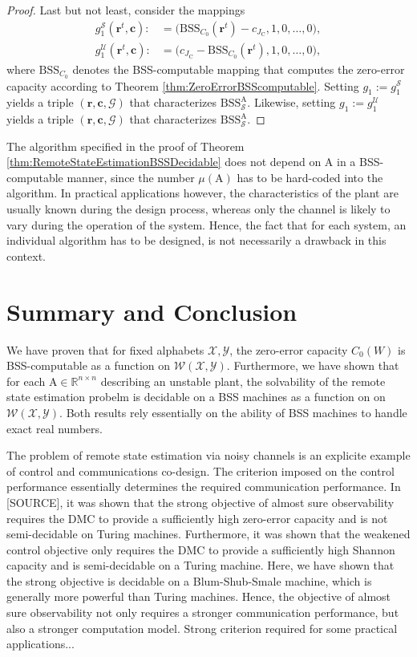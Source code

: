 \documentclass[conference]{IEEEtran}
\def\X{{\mathcal X}}
\def\Y{{\mathcal Y}}
\def\G{{\mathcal G}}
\def\W{{\mathcal W}}
\def\S{{\mathcal S}}
\def\U{{\mathcal U}}
\def\RR{{\mathbb R}}
\def\mA{\bm{\mathrm{A}}}
\newcommand{\BSS}{\mathrm{BSS}}
\newcommand{\sdummy}{{\color{red}[SOURCE]}}
\begin{document}
\begin{proof}
					Last but not least, consider the mappings
					\begin{align*}	g_1^\S(\bm{r}^t,\bm{c}) :&= \big(\BSS_{C_0}(\bm{r}^t) - c_{J_\mathrm{C}}, 1, 0, \ldots, 0\big), \\
									g_1^\U(\bm{r}^t,\bm{c}) :&= \big(c_{J_\mathrm{C}} - \BSS_{C_0}(\bm{r}^t), 1, 0, \ldots, 0\big), 
					\end{align*}
					where \(\BSS_{C_0}\) denotes the BSS-computable mapping that computes the zero-error capacity according to Theorem \ref{thm:ZeroErrorBSScomputable}. 
					Setting \(g_1 := g_1^\S\) yields a triple \((\bm{r}, \bm{c}, \G)\)
					that characterizes \(\BSS_{\S}^{\mA}\). Likewise, setting \(g_1 := g_1^\U\) yields a triple \((\bm{r}, \bm{c}, \G)\)
					that characterizes \(\BSS_{\S}^{\mA}\).
	\end{proof}
	
	The algorithm specified in the proof of Theorem \ref{thm:RemoteStateEstimationBSSDecidable} does not depend on \(\mA\) in a BSS-computable manner,
	since the number \(\mu(\mA)\) has to be hard-coded into the algorithm. In practical applications however, the characteristics of the plant
	are usually known during the design process, whereas only the channel is likely to vary during the operation
	of the system. Hence, the fact that for each system, an individual algorithm has to be designed, is not necessarily a drawback in this context.
	
\section{Summary and Conclusion}	\label{sec:Conclusion}
	We have proven that for fixed alphabets \(\X,\Y\), the zero-error capacity \(C_0(W)\) is BSS-computable as a function on \(\W(\X,\Y)\).
	Furthermore, we have shown that for each \(\mA\in \RR^{n\times n}\) describing an unstable plant, the solvability of the remote state estimation
	probelm is decidable on a BSS machines as a function on on \(\W(\X,\Y)\). Both results rely essentially on the ability of BSS machines to handle exact real numbers.
	
	The problem of remote state estimation via noisy channels is an explicite example of control and communications co-design. The criterion imposed on the control performance
	essentially determines the required communication performance. In \sdummy, it was shown that the strong objective of almost sure observability requires the DMC to provide a sufficiently high
	zero-error capacity and is not semi-decidable on Turing machines. Furthermore, it was shown that the weakened control objective only requires the DMC to provide a sufficiently high
	Shannon capacity and is semi-decidable on a Turing machine. Here, we have shown that the strong objective is decidable on a Blum-Shub-Smale machine, which is generally more powerful than
	Turing machines. Hence, the objective of almost sure observability not only requires a stronger communication performance, but also a stronger computation model.
	{\color{red} Strong criterion required for some practical applications...}
		



\end{document}
